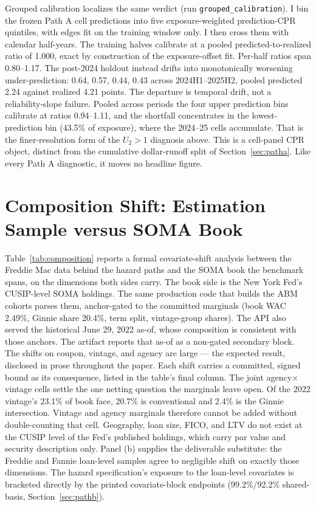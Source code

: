 \documentclass[12pt]{article}
\begin{document}
Grouped calibration localizes the same verdict (run \texttt{grouped\_calibration}). I bin the frozen Path A cell predictions into five exposure-weighted prediction-CPR quintiles, with edges fit on the training window only. I then cross them with calendar half-years. The training halves calibrate at a pooled predicted-to-realized ratio of 1.000, exact by construction of the exposure-offset fit. Per-half ratios span 0.80--1.17. The post-2024 holdout instead drifts into monotonically worsening under-prediction: 0.64, 0.57, 0.44, 0.43 across 2024H1--2025H2, pooled predicted 2.24 against realized 4.21 points. The departure is temporal drift, not a reliability-slope failure. Pooled across periods the four upper prediction bins calibrate at ratios 0.94--1.11, and the shortfall concentrates in the lowest-prediction bin (43.5\% of exposure), where the 2024--25 cells accumulate. That is the finer-resolution form of the $U_2 > 1$ diagnosis above. This is a cell-panel CPR object, distinct from the cumulative dollar-runoff split of Section~\ref{sec:patha}. Like every Path A diagnostic, it moves no headline figure.

\section{Composition Shift: Estimation Sample versus SOMA Book}\label{app:composition}

Table~\ref{tab:composition} reports a formal covariate-shift analysis between the Freddie Mac data behind the hazard paths and the SOMA book the benchmark spans, on the dimensions both sides carry. The book side is the New York Fed's CUSIP-level SOMA holdings. The same production code that builds the ABM cohorts parses them, anchor-gated to the committed marginals (book WAC 2.49\%, Ginnie share 20.4\%, term split, vintage-group shares). The API also served the historical June 29, 2022 as-of, whose composition is consistent with those anchors. The artifact reports that as-of as a non-gated secondary block. The shifts on coupon, vintage, and agency are large --- the expected result, disclosed in prose throughout the paper. Each shift carries a committed, signed bound as its consequence, listed in the table's final column. The joint agency$\times$vintage cells settle the one netting question the marginals leave open. Of the 2022 vintage's 23.1\% of book face, 20.7\% is conventional and 2.4\% is the Ginnie intersection. Vintage and agency marginals therefore cannot be added without double-counting that cell. Geography, loan size, FICO, and LTV do not exist at the CUSIP level of the Fed's published holdings, which carry par value and security description only. Panel (b) supplies the deliverable substitute: the Freddie and Fannie loan-level samples agree to negligible shift on exactly those dimensions. The hazard specification's exposure to the loan-level covariates is bracketed directly by the printed covariate-block endpoints (99.2\%/92.2\% shared-basis, Section~\ref{sec:pathb}).
\end{document}

